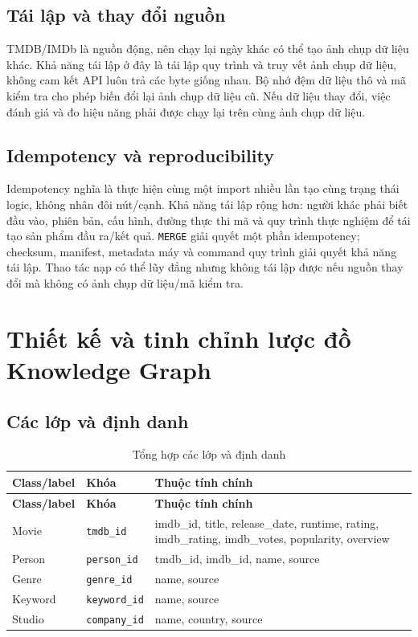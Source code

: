\subsection{Tái lập và thay đổi nguồn}

TMDB/IMDb là nguồn động, nên chạy lại ngày khác có thể tạo ảnh chụp dữ liệu khác.
Khả năng tái lập ở đây là tái lập quy trình và truy vết ảnh chụp dữ liệu, không
cam kết API luôn trả các byte giống nhau. Bộ nhớ đệm dữ liệu thô và mã kiểm tra
cho phép biến đổi lại ảnh chụp dữ liệu cũ. Nếu dữ liệu thay đổi, việc đánh giá và
đo hiệu năng phải được chạy lại trên cùng ảnh chụp dữ liệu.

\subsection{Idempotency và reproducibility}

Idempotency nghĩa là thực hiện cùng một import nhiều lần tạo cùng trạng thái logic,
không nhân đôi nút/cạnh. Khả năng tái lập rộng hơn: người khác phải biết đầu vào,
phiên bản, cấu hình, đường thực thi mã và quy trình thực nghiệm để tái tạo sản
phẩm đầu ra/kết quả. \texttt{MERGE}
giải quyết một phần idempotency; checksum, manifest, metadata máy và command
quy trình giải quyết khả năng tái lập. Thao tác nạp có thể lũy đẳng nhưng không
tái lập được nếu nguồn thay đổi mà không có ảnh chụp dữ liệu/mã kiểm tra.

\section{Thiết kế và tinh chỉnh lược đồ Knowledge Graph}

\subsection{Các lớp và định danh}

\begin{longtable}{|>{\raggedright\arraybackslash}p{}|>{\raggedright\arraybackslash}p{}|>{\raggedright\arraybackslash}p{}|}
\caption{Tổng hợp các lớp và định danh}\label{tab:3-1} \\
\hline
\textbf{Class/label} & \textbf{Khóa} & \textbf{Thuộc tính chính} \\ \hline
\endfirsthead\hline \textbf{Class/label} & \textbf{Khóa} & \textbf{Thuộc tính chính} \\ \hline\endhead
Movie & \texttt{tmdb\_id} & imdb\_id, title, release\_date, runtime, rating, imdb\_rating, imdb\_votes, popularity, overview \\ \hline
Person & \texttt{person\_id} & tmdb\_id, imdb\_id, name, source \\ \hline
Genre & \texttt{genre\_id} & name, source \\ \hline
Keyword & \texttt{keyword\_id} & name, source \\ \hline
Studio & \texttt{company\_id} & name, country, source \\ \hline
\end{longtable}

